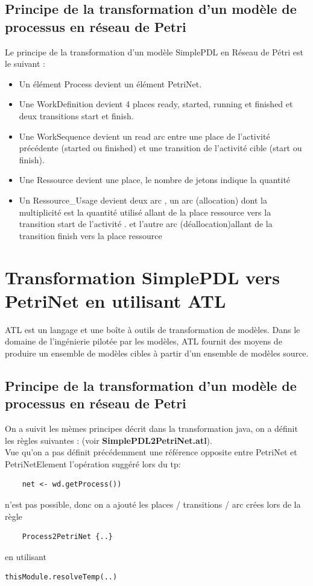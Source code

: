 \documentclass{article}
\begin{document}
\subsection{Principe de la transformation d’un modèle de processus en réseau de Petri}
Le principe de la transformation d’un modèle SimplePDL en Réseau de Pétri est le suivant :
\begin{itemize}
    \item Un élément Process devient un élément PetriNet.
    \item Une WorkDefinition devient 4 places ready, started, running et finished et deux transitions start et finish.
    \item Une WorkSequence devient un read arc entre une place de l’activité précédente (started ou finished) et une transition de l’activité cible (start ou finish).
    \item Une Ressource devient une place, le nombre de jetons indique la quantité
    \item Un Ressource\_Usage devient deux arc , un arc (allocation) dont la multiplicité est la quantité utilisé allant de la place ressource vers la transition start de l'activité . et l'autre arc (déallocation)allant de la transition finish vers la place ressource
\end{itemize}

\section{Transformation SimplePDL vers PetriNet en utilisant ATL}
ATL est un langage et une boîte à outils de transformation de modèles. Dans le domaine de l'ingénierie pilotée par les modèles, 
ATL fournit des moyens de produire un ensemble de modèles cibles à partir d'un ensemble de modèles source.
\subsection{Principe de la transformation d’un modèle de processus en réseau de Petri}
On a suivit les mèmes principes décrit dans la transformation java, on a définit les règles suivantes : (voir \textbf{SimplePDL2PetriNet.atl}). \\
Vue qu'on a pas définit précédemment une référence opposite entre PetriNet et PetriNetElement l'opération suggéré lors du tp: 
\begin{verbatim}
    net <- wd.getProcess())
\end{verbatim}
n'est pas possible, donc on a ajouté les places / transitions / arc crées lors de la règle 
\begin{verbatim}
    Process2PetriNet {..}
\end{verbatim}
en utilisant 
\begin{verbatim}
thisModule.resolveTemp(..)
\end{verbatim}
\end{document}
